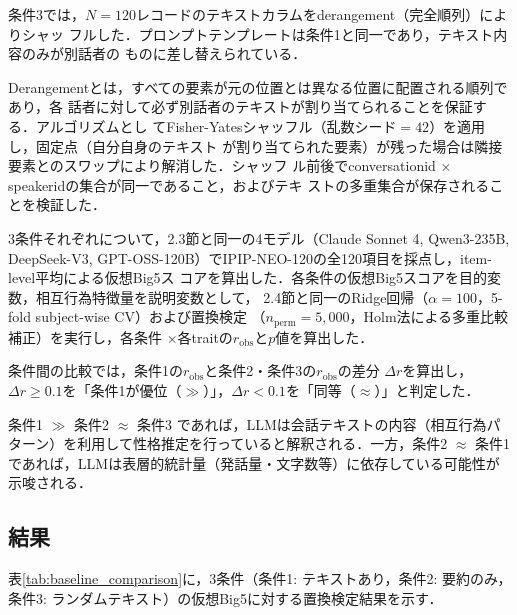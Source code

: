 \documentclass[dvipdfmx,11pt,a4paper]{bxjsarticle}
\renewcommand{\_}{\paperorigunderscore\allowbreak}%
\begin{document}
条件3では，$N = 120$レコードのテキストカラムをderangement（完全順列）によりシャッ
フルした．プロンプトテンプレートは条件1と同一であり，テキスト内容のみが別話者の
ものに差し替えられている．

Derangementとは，すべての要素が元の位置とは異なる位置に配置される順列であり，各
話者に対して必ず別話者のテキストが割り当てられることを保証する．アルゴリズムとし
てFisher-Yatesシャッフル（乱数シード$= 42$）を適用し，固定点（自分自身のテキスト
が割り当てられた要素）が残った場合は隣接要素とのスワップにより解消した．シャッフ
ル前後でconversation\_id $\times$ speaker\_idの集合が同一であること，およびテキ
ストの多重集合が保存されることを検証した．

3条件それぞれについて，2.3節と同一の4モデル（Claude Sonnet 4, Qwen3-235B, DeepSeek-V3,
GPT-OSS-120B）でIPIP-NEO-120の全120項目を採点し，item-level平均による仮想Big5ス
コアを算出した．各条件の仮想Big5スコアを目的変数，相互行為特徴量を説明変数として，
2.4節と同一のRidge回帰（$\alpha = 100$，5-fold subject-wise CV）および置換検定
（$n_{\text{perm}} = 5{,}000$，Holm法による多重比較補正）を実行し，各条件
$\times$各traitの$r_{\text{obs}}$と$p$値を算出した．


条件間の比較では，条件1の$r_{\text{obs}}$と条件2・条件3の$r_{\text{obs}}$の差分
$\Delta r$を算出し，$\Delta r \geq 0.1$を「条件1が優位（$\gg$）」，$\Delta r <
0.1$を「同等（$\approx$）」と判定した．

条件1 $\gg$ 条件2 $\approx$ 条件3 であれば，LLMは会話テキストの内容（相互行為パ
ターン）を利用して性格推定を行っていると解釈される．一方，条件2 $\approx$ 条件1
であれば，LLMは表層的統計量（発話量・文字数等）に依存している可能性が示唆される．

\subsection{結果}
\label{sec:result_baseline}

表\ref{tab:baseline_comparison}に，3条件（条件1: テキストあり，条件2: 要約のみ，
条件3: ランダムテキスト）の仮想Big5に対する置換検定結果を示す．
\end{document}
